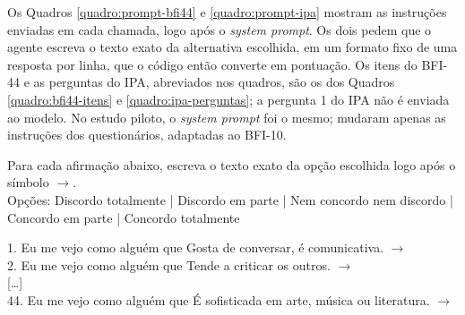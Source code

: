 Os Quadros \ref{quadro:prompt-bfi44} e \ref{quadro:prompt-ipa} mostram as
instruções enviadas em cada chamada, logo após o \textit{system prompt}.
Os dois pedem que o agente escreva o texto exato da alternativa
escolhida, em um formato fixo de uma resposta por linha, que o código
então converte em pontuação. Os itens do BFI-44 e as perguntas
do IPA, abreviados nos quadros, são os dos Quadros
\ref{quadro:bfi44-itens} e \ref{quadro:ipa-perguntas}; a pergunta 1 do
IPA não é enviada ao modelo. No estudo piloto, o \textit{system prompt}
foi o mesmo; mudaram apenas as instruções dos questionários, adaptadas ao
BFI-10.

\begin{quadro}[htbp]
    \caption{Instrução enviada ao modelo para o BFI-44}
    \label{quadro:prompt-bfi44}
    \begin{promptbox}
    Para cada afirmação abaixo, escreva o texto exato da opção escolhida logo após o símbolo $\rightarrow$.\\
    Opções: \textquotedbl Discordo totalmente\textquotedbl{} | \textquotedbl Discordo em parte\textquotedbl{} | \textquotedbl Nem concordo nem discordo\textquotedbl{} | \textquotedbl Concordo em parte\textquotedbl{} | \textquotedbl Concordo totalmente\textquotedbl

    1. Eu me vejo como alguém que Gosta de conversar, é comunicativa. $\rightarrow$\\
    2. Eu me vejo como alguém que Tende a criticar os outros. $\rightarrow$\\
    {[\dots]} \\
    44. Eu me vejo como alguém que É sofisticada em arte, música ou literatura. $\rightarrow$
    \end{promptbox}
\end{quadro}

